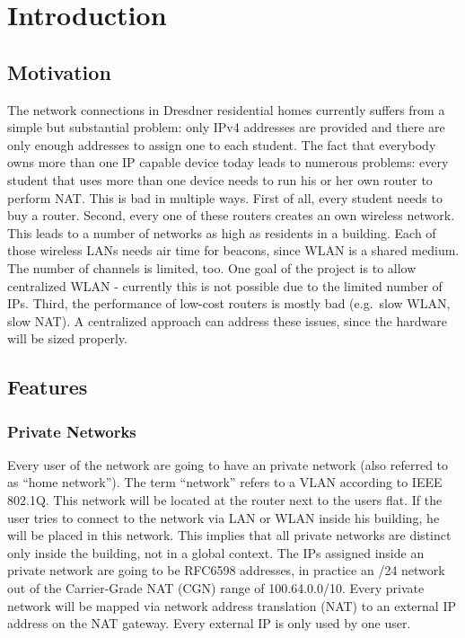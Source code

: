 \documentclass{report}
\begin{document}
\chapter{Introduction}\label{introduction}

\section{Motivation}\label{motivation}

The network connections in Dresdner residential homes currently suffers
from a simple but substantial problem: only IPv4 addresses are provided
and there are only enough addresses to assign one to each student. The
fact that everybody owns more than one IP capable device today leads to
numerous problems: every student that uses more than one device needs to
run his or her own router to perform NAT. This is bad in multiple ways.
First of all, every student needs to buy a router. Second, every one of
these routers creates an own wireless network. This leads to a number of
networks as high as residents in a building. Each of those wireless LANs
needs air time for beacons, since WLAN is a shared medium\cite{FastWiFi}. The
number of channels is limited, too. One goal of the project is to allow
centralized WLAN - currently this is not possible due to the limited
number of IPs. Third, the performance of low-cost routers is mostly bad
(e.g.~slow WLAN, slow NAT). A centralized approach can address these
issues, since the hardware will be sized properly.


\section{Features}\label{features}

\subsection{Private Networks}\label{private-networks}

Every user of the network are going to have an private network (also
referred to as ``home network''). The term ``network'' refers to a VLAN
according to IEEE 802.1Q\cite{802.1Q}. This network will be located at the router
next to the users flat. If the user tries to connect to the network via
LAN or WLAN inside his building, he will be placed in this network. This
implies that all private networks are distinct only inside the building,
not in a global context. The IPs assigned inside an private network are
going to be RFC6598 addresses\cite{CGN}, in practice an /24 network out of the
Carrier-Grade NAT (CGN) range of 100.64.0.0/10. Every private network
will be mapped via network address translation (NAT)\cite{NAT} to an external IP
address on the NAT gateway. Every external IP is only used by one user.
\end{document}
